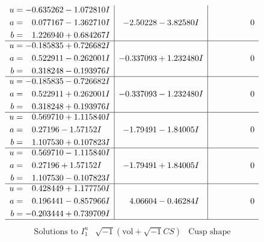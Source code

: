 \documentclass[1p]{elsarticle_modified}
\theoremstyle{definition}
\newcommand{\I}{\sqrt{-1}}
\begin{document}
$$\begin{array}{c|c|c}
\begin{aligned}
u &= -0.635262 - 1.072810 I \\
a &= \phantom{-}0.077167 - 1.362710 I \\
b &= \phantom{-}1.226940 + 0.684267 I\end{aligned}
 & -2.50228 - 3.82580 I & \phantom{-0.000000 } 0 \\ \hline\begin{aligned}
u &= -0.185835 + 0.726682 I \\
a &= \phantom{-}0.522911 - 0.262001 I \\
b &= \phantom{-}0.318248 - 0.193976 I\end{aligned}
 & -0.337093 + 1.232480 I & \phantom{-0.000000 } 0 \\ \hline\begin{aligned}
u &= -0.185835 - 0.726682 I \\
a &= \phantom{-}0.522911 + 0.262001 I \\
b &= \phantom{-}0.318248 + 0.193976 I\end{aligned}
 & -0.337093 - 1.232480 I & \phantom{-0.000000 } 0 \\ \hline\begin{aligned}
u &= \phantom{-}0.569710 + 1.115840 I \\
a &= \phantom{-}0.27196 - 1.57152 I \\
b &= \phantom{-}1.107530 + 0.107823 I\end{aligned}
 & -1.79491 - 1.84005 I & \phantom{-0.000000 } 0 \\ \hline\begin{aligned}
u &= \phantom{-}0.569710 - 1.115840 I \\
a &= \phantom{-}0.27196 + 1.57152 I \\
b &= \phantom{-}1.107530 - 0.107823 I\end{aligned}
 & -1.79491 + 1.84005 I & \phantom{-0.000000 } 0 \\ \hline\begin{aligned}
u &= \phantom{-}0.428449 + 1.177750 I \\
a &= \phantom{-}0.196441 - 0.857966 I \\
b &= -0.203444 + 0.739709 I\end{aligned}
 & \phantom{-}4.06604 - 0.46284 I & \phantom{-0.000000 } 0\\
 \hline 
 \end{array}$$\newpage$$\begin{array}{c|c|c}  
\text{Solutions to }I^u_{1}& \I (\text{vol} + \sqrt{-1}CS) & \text{Cusp shape}\\

\end{array}$$
\end{document}
